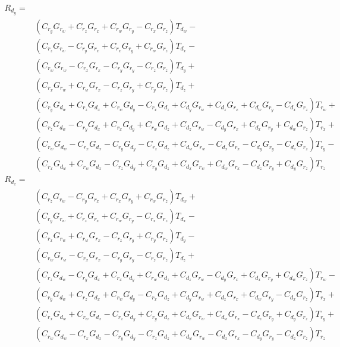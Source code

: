 \documentclass[12pt]{article}
\begin{document}
	\begin{equation}
		\begin{split}
			R_{d_y} = \\&
			(C_{r_y} G_{r_w} + 
			C_{r_z} G_{r_x} + C_{r_w} G_{r_y} - 
			C_{r_x} G_{r_z}) T_{d_w} -\\& (C_{r_z} G_{r_w} - 
			C_{r_y} G_{r_x} + C_{r_x} G_{r_y} + 
			C_{r_w} G_{r_z}) T_{d_x} -\\& (C_{r_w} G_{r_w} - 
			C_{r_x} G_{r_x} - C_{r_y} G_{r_y} - 
			C_{r_z} G_{r_z}) T_{d_y} +\\& (C_{r_x} G_{r_w} + 
			C_{r_w} G_{r_x} - C_{r_z} G_{r_y} + 
			C_{r_y} G_{r_z}) T_{d_z} + \\&(C_{r_y} G_{d_w} + 
			C_{r_z} G_{d_x} + C_{r_w} G_{d_y} - C_{r_x} G_{d_z} + 
			C_{d_y} G_{r_w} + C_{d_z} G_{r_x} + C_{d_w} G_{r_y} - 
			C_{d_x} G_{r_z}) T_{r_w} +\\& (C_{r_z} G_{d_w} - 
			C_{r_y} G_{d_x} + C_{r_x} G_{d_y} + C_{r_w} G_{d_z} + 
			C_{d_z} G_{r_w} - C_{d_y} G_{r_x} + C_{d_x} G_{r_y} + 
			C_{d_w} G_{r_z}) T_{r_x} +\\& (C_{r_w} G_{d_w} - 
			C_{r_x} G_{d_x} - C_{r_y} G_{d_y} - C_{r_z} G_{d_z} + 
			C_{d_w} G_{r_w} - C_{d_x} G_{r_x} - C_{d_y} G_{r_y} - 
			C_{d_z} G_{r_z}) T_{r_y} -\\& (C_{r_x} G_{d_w} + 
			C_{r_w} G_{d_x} - C_{r_z} G_{d_y} + C_{r_y} G_{d_z} + 
			C_{d_x} G_{r_w} + C_{d_w} G_{r_x} - C_{d_z} G_{r_y} + 
			C_{d_y} G_{r_z}) T_{r_z}
		\end{split}
		\label{eq:rdy}
	\end{equation}
	\begin{equation}
		\begin{split}
			R_{d_z} = \\&
			(C_{r_z} G_{r_w} - 
			C_{r_y} G_{r_x} + C_{r_x} G_{r_y} + 
			C_{r_w} G_{r_z}) T_{d_w} + \\&(C_{r_y} G_{r_w} + 
			C_{r_z} G_{r_x} + C_{r_w} G_{r_y} - 
			C_{r_x} G_{r_z}) T_{d_x} - \\&(C_{r_x} G_{r_w} + 
			C_{r_w} G_{r_x} - C_{r_z} G_{r_y} + 
			C_{r_y} G_{r_z}) T_{d_y} - \\&(C_{r_w} G_{r_w} - 
			C_{r_x} G_{r_x} - C_{r_y} G_{r_y} - 
			C_{r_z} G_{r_z}) T_{d_z} + \\&(C_{r_z} G_{d_w} - 
			C_{r_y} G_{d_x} + C_{r_x} G_{d_y} + C_{r_w} G_{d_z} + 
			C_{d_z} G_{r_w} - C_{d_y} G_{r_x} + C_{d_x} G_{r_y} + 
			C_{d_w} G_{r_z}) T_{r_w} -\\& (C_{r_y} G_{d_w} + 
			C_{r_z} G_{d_x} + C_{r_w} G_{d_y} - C_{r_x} G_{d_z} + 
			C_{d_y} G_{r_w} + C_{d_z} G_{r_x} + C_{d_w} G_{r_y} - 
			C_{d_x} G_{r_z}) T_{r_x} +\\& (C_{r_x} G_{d_w} + 
			C_{r_w} G_{d_x} - C_{r_z} G_{d_y} + C_{r_y} G_{d_z} + 
			C_{d_x} G_{r_w} + C_{d_w} G_{r_x} - C_{d_z} G_{r_y} + 
			C_{d_y} G_{r_z}) T_{r_y} +\\& (C_{r_w} G_{d_w} - 
			C_{r_x} G_{d_x} - C_{r_y} G_{d_y} - C_{r_z} G_{d_z} + 
			C_{d_w} G_{r_w} - C_{d_x} G_{r_x} - C_{d_y} G_{r_y} - 
			C_{d_z} G_{r_z}) T_{r_z}
		\end{split}
		\label{eq:rdz}
	\end{equation}
	
\end{document}
